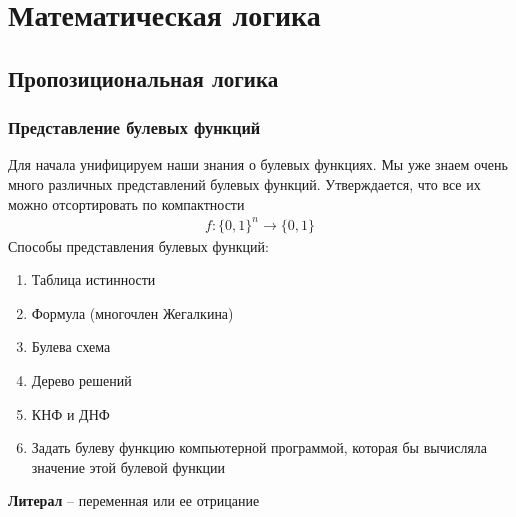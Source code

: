 \chapter{Математическая логика}
\section{Пропозициональная логика}
\subsection{Представление булевых функций}
Для начала унифицируем наши знания о булевых функциях. Мы уже знаем очень много различных
представлений булевых функций. Утверждается, что все их можно отсортировать по компактности
\begin{gather*}
  f: \{0, 1\}^n \longrightarrow \{0,1\}
\end{gather*}
Способы представления булевых функций:
\begin{enumerate}
  \item Таблица истинности
  \item Формула (многочлен Жегалкина)
  \item Булева схема
  \item Дерево решений
  \item КНФ и ДНФ
  \item Задать булеву функцию компьютерной программой, которая 
  бы вычисляла значение этой булевой функции 
\end{enumerate}

\begin{conj}
  \textbf{Литерал} -- переменная или ее отрицание 
\end{conj}

